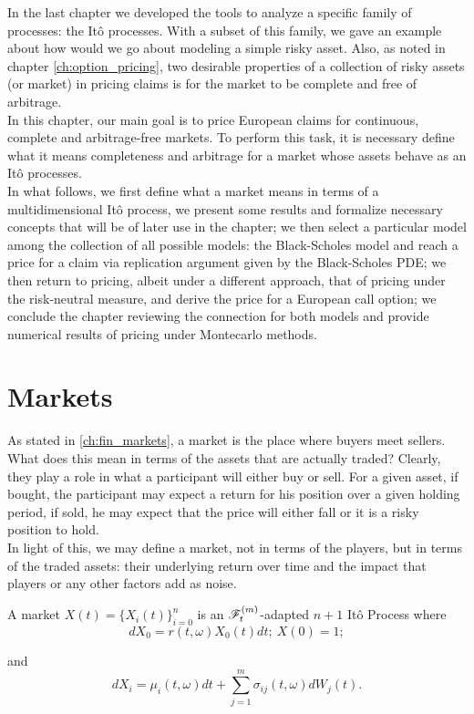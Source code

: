 \documentclass[../TGMAFFIRO.tex]{subfiles}
\begin{document}
In the last chapter we developed the tools to analyze a specific family of processes: the It\^o processes. With a subset of this family, we gave an example about how would we go about modeling a simple risky asset. Also, as noted in chapter \ref{ch:option_pricing}, two desirable properties of a collection of risky assets (or market) in pricing claims is for the market to be complete and free of arbitrage.\\

In this chapter, our main goal is to price European claims for continuous, complete and arbitrage-free markets. To perform this task, it is necessary define what it means completeness and arbitrage for a market whose assets behave as an It\^o processes.\\

In what follows, we first define what a market means in terms of a multidimensional It\^o process, we present some results and formalize necessary concepts that will be of later use in the chapter; we then select a particular model among the collection of all possible models: the Black-Scholes model and reach a price for a claim via replication argument given by the Black-Scholes PDE; we then return to pricing, albeit under a different approach, that of pricing under the risk-neutral measure, and derive the price for a European call option; we conclude the chapter reviewing the connection for both models and provide numerical results of pricing under Montecarlo methods.\\

\section{Markets}
As stated in \ref{ch:fin_markets}, a market is the place where buyers meet sellers. What does this mean in terms of the assets that are actually traded? Clearly, they play a role in what a participant will either buy or sell. For a given asset, if bought, the participant may expect a return for his position over a given holding period, if sold, he may expect that the price will either fall or it is a risky position to hold.\\

In light of this, we may define a market, not in terms of the players, but in terms of the traded assets: their underlying return over time and the impact that players or any other factors add as noise. 
\begin{definition}
	A market $X(t) = \{X_i(t)\}_{i=0}^n$ is an $\mathscr{F}^{(m)}_t$-adapted $n+1$ It\^o Process where
	\begin{equation}
		dX_0 = r(t,\omega) X_0(t) dt; \ X(0) = 1; \label{eq:safe_investment}
	\end{equation}
	
	and
	\begin{equation}
		dX_i = \mu_i(t,\omega) dt + \sum_{j=1}^{m}\sigma_{ij}(t,\omega)dW_j(t) \label{eq:risky_asset}.
	\end{equation}
\end{definition}
\end{document}
